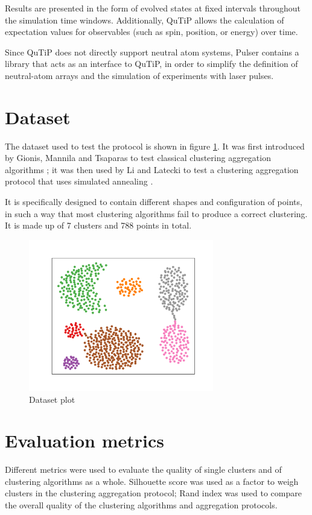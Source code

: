 Results are presented in the form of evolved states at fixed intervals throughout the simulation time windows. Additionally, QuTiP allows the calculation of expectation values for observables (such as spin, position, or energy) over time.

Since QuTiP does not directly support neutral atom systems, Pulser contains a library that acts as an interface to QuTiP, in order to simplify the definition of neutral-atom arrays and the simulation of experiments with laser pulses. 

\section{Dataset}
\label{sec:dataset}
The dataset used to test the protocol is shown in figure \ref{fig:dataset}. It was first introduced by Gionis, Mannila and Tsaparas to test classical clustering aggregation algorithms \cite{dataset}; it was then used by Li and Latecki to test a clustering aggregation protocol that uses simulated annealing \cite{aggregation}.

It is specifically designed to contain different shapes and configuration of points, in such a way that most clustering algorithms fail to produce a correct clustering. It is made up of 7 clusters and 788 points in total.

\begin{figure}[ht!]
  \centering 
  \includegraphics[width=0.72\textwidth]{figures/05experimental_setup/dataset.pdf}
  \caption{Dataset plot}
  \label{fig:dataset}
\end{figure}

\section{Evaluation metrics}
Different metrics were used to evaluate the quality of single clusters and of clustering algorithms as a whole. Silhouette score was used as a factor to weigh clusters in the clustering aggregation protocol; Rand index was used to compare the overall quality of the clustering algorithms and aggregation protocols. %

